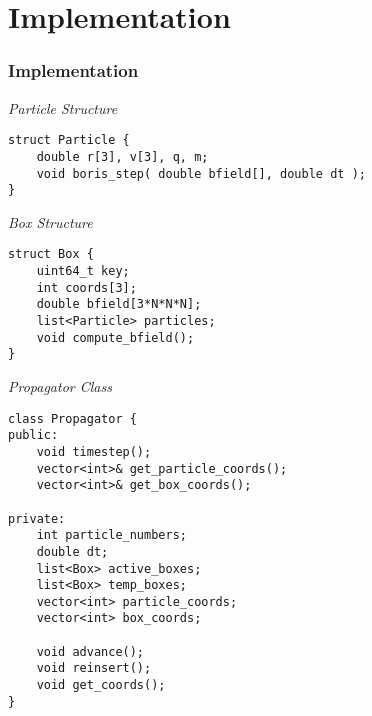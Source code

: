 \section{Implementation}
\begin{frame}[fragile]
    \frametitle{Implementation}

    \textit{Particle Structure}
    \begin{verbatim}
struct Particle {
    double r[3], v[3], q, m;
    void boris_step( double bfield[], double dt );
}
    \end{verbatim}

    \textit{Box Structure}
    \begin{verbatim}
struct Box {
    uint64_t key;
    int coords[3];
    double bfield[3*N*N*N];
    list<Particle> particles;
    void compute_bfield();
}
    \end{verbatim}

\end{frame}


\begin{frame}[fragile]

    \textit{Propagator Class}
    \begin{verbatim}
class Propagator {
public:
    void timestep();
    vector<int>& get_particle_coords();
    vector<int>& get_box_coords();

private:
    int particle_numbers;
    double dt;
    list<Box> active_boxes;
    list<Box> temp_boxes;
    vector<int> particle_coords;
    vector<int> box_coords;

    void advance();
    void reinsert();
    void get_coords();
}
    \end{verbatim}

\end{frame}

